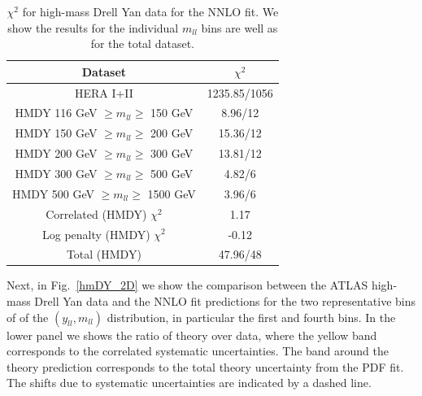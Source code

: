 \begin{table}[t]
  \centering
  \begin{tabular}{|c|c|}
    \hline
    Dataset  &   $\chi^2$ \\
    \hline
    \hline
    HERA I+II & 1235.85/1056\\
    \hline
    HMDY  116 GeV $\ge m_{ll} \ge $ 150 GeV  &  8.96/12 \\
    HMDY  150 GeV $\ge m_{ll} \ge $ 200 GeV  &  15.36/12 \\
    HMDY  200 GeV $\ge m_{ll} \ge $ 300 GeV  &  13.81/12 \\
    HMDY  300 GeV $\ge m_{ll} \ge $ 500 GeV  &  4.82/6 \\
    HMDY  500 GeV $\ge m_{ll} \ge $ 1500 GeV &  3.96/6 \\
    \hline
    Correlated (HMDY) $\chi^2$ & 1.17 \\
    Log penalty (HMDY) $\chi^2$  & -0.12 \\
    \hline
    \hline
    Total  (HMDY) & 47.96/48 \\
    \hline
    \end{tabular}
  \caption{$\chi^{2}$ for high-mass Drell Yan data for the NNLO fit.
    We show the results for the individual $m_{ll}$ bins
    are well as for the total dataset.
\label{tab:chi2fit}
  }
\end{table}

Next, in Fig.~\ref{hmDY_2D} we show the
comparison between the ATLAS high-mass Drell Yan data and the NNLO fit predictions
for the  two representative bins of of the $(y_{ll},m_{ll})$ distribution,
  in particular the first and fourth bins.
%
In the lower panel we shows the ratio of theory over data, where the yellow band
corresponds to the correlated systematic uncertainties.
%
The band around the theory prediction corresponds to the total
theory uncertainty from the PDF fit.
%
The shifts due to systematic uncertainties are indicated by a dashed line.

